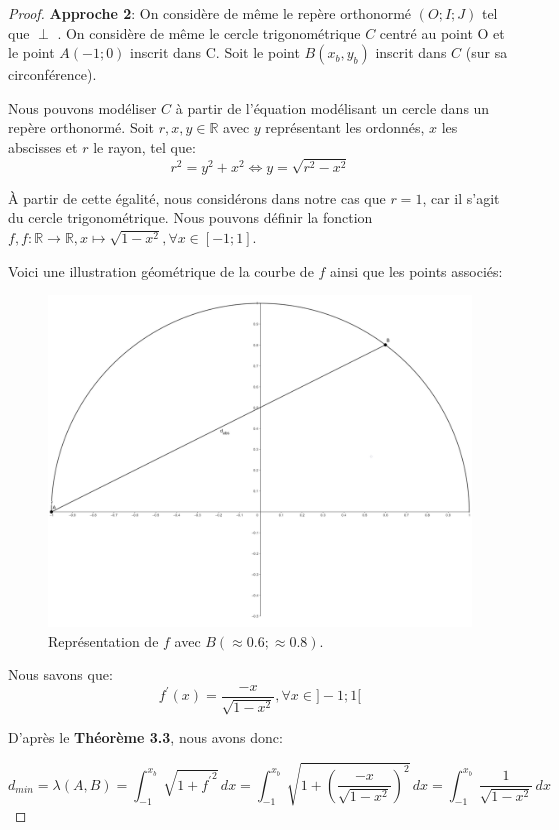 \documentclass{amsart}
\theoremstyle{definition}
\theoremstyle{remark}
\numberwithin{equation}{section}
\renewcommand*{\overrightarrow}[1]{\vbox{\halign{##\cr 
  \tiny\rightarrowfill\cr\noalign{\nointerlineskip\vskip1pt} 
  $#1\mskip2mu$\cr}}}
\begin{document}
\begin{proof}
  \textbf{Approche 2}: On considère de même le repère orthonormé $(O;I;J)$ tel que \overrightarrow{OI} $\perp$ \overrightarrow{OJ}. On considère de même le cercle trigonométrique $C$ centré au point O et le point $A(-1;0)$ inscrit dans C. Soit le point
  $B(x_b,y_b)$ inscrit dans $C$ (sur sa circonférence).

  Nous pouvons modéliser $C$ à partir de l'équation modélisant un cercle dans un repère orthonormé. Soit $r,x,y\in\mathbb{R}$ avec $y$ représentant les ordonnés, $x$ les abscisses et $r$ le rayon, tel que:
  \[r^2=y^2+x^2 \Leftrightarrow  y = \sqrt{r^2-x^2}\]

  À partir de cette égalité, nous considérons dans notre cas que $r=1$, car il s'agit du cercle trigonométrique. Nous pouvons définir la fonction $f,f:\mathbb{R}\longrightarrow \mathbb{R}, x\longmapsto \sqrt{1-x^2}, \forall x\in[-1;1]$.

  Voici une illustration géométrique de la courbe de $f$ ainsi que les points associés:

  \begin{figure}[H]
    \centering
    \includegraphics[scale=0.13]{angle_function.png}
    \caption{Représentation de $f$ avec $B(\approx0.6;\approx0.8)$.}
  \end{figure}

  Nous savons que: \[f^\prime(x)=\frac{-x}{\sqrt{1-x^2}}, \forall x\in]-1;1[\]

  D'après le \textbf{Théorème 3.3}, nous avons donc:

  \[d_{min}=\lambda(A,B)=\int_{-1}^{x_b} \sqrt{1+{f^\prime}^2} \,dx=\int_{-1}^{x_b} \sqrt{1+(\frac{-x}{\sqrt{1-x^2}})^2}\,dx=\int_{-1}^{x_b} \frac{1}{\sqrt{1-x^2}}\,dx\]


\end{proof}
\end{document}
